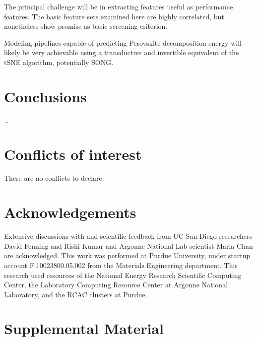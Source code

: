 \documentclass[twoside, twocolumn, 9pt, draft]{article}
\begin{document}
The principal challenge will be in extracting features useful as
performance features. The basic feature sets examined here are highly
correlated, but nonetheless show promise as basic screening criterion.

Modeling pipelines capable of predicting Perovskite decomposition
energy will likely be very achievable using a transductive and
invertible equivalent of the tSNE algorithm, potentially SONG.

\section*{Conclusions}
\label{sec:org58e46c9}
\ldots{}\\

\section*{Conflicts of interest}
\label{sec:orga973e6a}
There are no conflicts to declare.

\section*{Acknowledgements}
\label{sec:orgf1d8133}
Extensive discussions with and scientific feedback from UC San Diego
researchers David Fenning and Rishi Kumar and Argonne National Lab
scientist Maria Chan are acknowledged. This work was performed at Purdue
University, under startup account F.10023800.05.002 from the Materials
Engineering department. This research used resources of the National
Energy Research Scientific Computing Center, the Laboratory Computing
Resource Center at Argonne National Laboratory, and the RCAC clusters at
Purdue.

\section*{Supplemental Material}
\label{sec:org9251e48}
\end{document}
